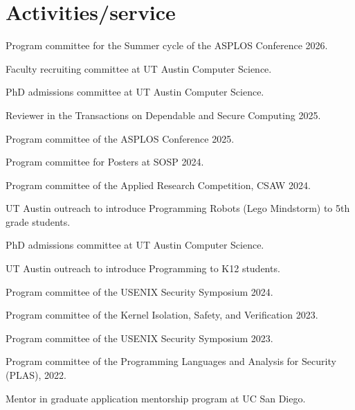 \section{Activities/service}


{ Program committee for the Summer cycle of the ASPLOS Conference 2026. }

{ Faculty recruiting committee at UT Austin Computer Science. }

{ PhD admissions committee at UT Austin Computer Science. }

{ Reviewer in the Transactions on Dependable and Secure Computing 2025. }

{ Program committee of the ASPLOS Conference 2025. }

{ Program committee for Posters at SOSP 2024. }

{ Program committee of the Applied Research Competition, CSAW 2024. }

{ UT Austin
outreach to introduce Programming Robots (Lego Mindstorm) to 5th grade students.
}

{ PhD admissions committee at UT Austin Computer Science. }

{ UT Austin
outreach to introduce Programming to K12 students. }

{ Program committee of the USENIX Security Symposium 2024. }

{ Program committee of the Kernel Isolation, Safety, and Verification 2023. }

{ Program committee of the USENIX Security Symposium 2023. }

{ Program committee of the Programming Languages and Analysis for Security (PLAS), 2022. }

{ Mentor in 
graduate application mentorship program at UC San Diego. }

